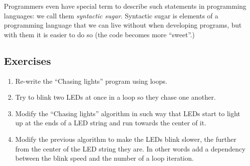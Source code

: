 \documentclass[../sparc.tex]{subfiles}
\begin{document}
Programmers even have special term to describe such statements in programming
languages: we call them \emph{syntactic sugar}.  Syntactic sugar is elements of
a programming language that we can live without when developing programs, but
with them it is easier to do so (the code becomes more ``sweet''.)

\subsection{Exercises}

\begin{enumerate}
\item Re-write the ``Chasing lights'' program using loops.
\item Try to blink two LEDs at once in a loop so they chase one another.
\item Modify the ``Chasing lights'' algorithm in such way that LEDs start to
  light up at the ends of a LED string and run towards the center of it.
\item Modify the previous algorithm to make the LEDs blink slower, the further
  from the center of the LED string they are.  In other words add a dependency
  between the blink speed and the number of a loop iteration.
\end{enumerate}
\end{document}
